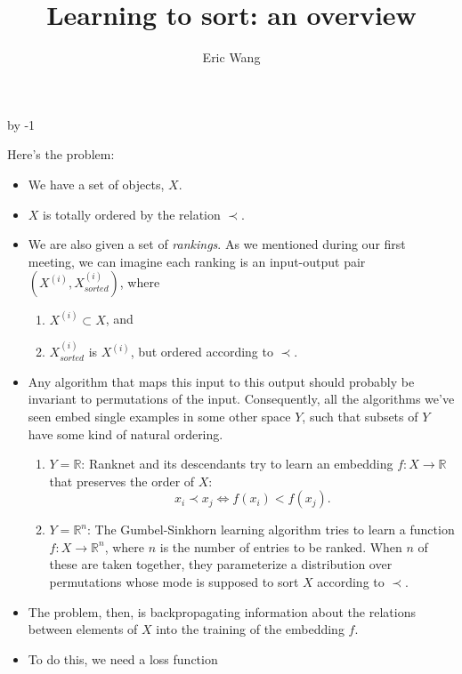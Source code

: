 \documentclass[11pt]{extarticle}
\def \R {{\mathbb R}}
\begin{document}
  
  \newcommand{\sg}[1]{\textcolor{red}{[{\textit{#1}}]}}
  \newcommand{\replace}[2]{\textcolor{red}{\sout{#1} #2}}
  \newcommand{\delet}[1]{\textcolor{red}{\sout{#1}}}
  \newcommand{\add}[1]{\textcolor{red}{#1}}
  
  \selectfont
  
  \advance\day by -1
  \author{Eric Wang}
  \title{Learning to sort: an overview}
  \maketitle

  Here's the problem:
  \begin{itemize}
    \item We have a set of objects, $X$.
    \item $X$ is totally ordered by the relation $\prec$.
    \item We are also given a set of \textit{rankings}. As we mentioned during our first meeting, we can imagine each ranking is an input-output pair $(X^{(i)}, X^{(i)}_{sorted})$, where 
      \begin{enumerate}
        \item $X^{(i)} \subset X$, and
        \item $X^{(i)}_{sorted}$ is $X^{(i)}$, but ordered according to $\prec$.
      \end{enumerate}
    \item Any algorithm that maps this input to this output should probably be invariant to permutations of the input. Consequently, all the algorithms we've seen embed single examples in some other space $Y$, such that subsets of $Y$ have some kind of natural ordering. 
      \begin{enumerate}
        \item $Y = \R$: Ranknet and its descendants try to learn an embedding $f:X \longrightarrow \R$ that preserves the order of $X$: 
        $$x_i \prec x_j \Longleftrightarrow f(x_i) < f(x_j).$$
        \item $Y = \R^{n}$: The Gumbel-Sinkhorn learning algorithm tries to learn a function $f:X \longrightarrow \R^{n}$, where $n$ is the number of entries to be ranked. When $n$ of these are taken together, they parameterize a distribution over permutations whose mode is supposed to sort $X$ according to $\prec$.
      \end{enumerate}
    \item The problem, then, is backpropagating information about the relations between elements of $X$ into the training of the embedding $f$.
    \item To do this, we need a loss function 


\end{itemize}
\end{document}
